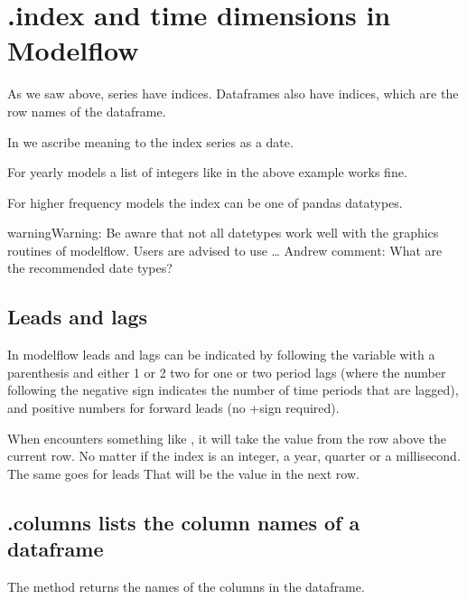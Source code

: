 \documentclass[letterpaper,10pt,english]{jupyterBook}
\begin{document}
\section{.index and time dimensions in Modelflow}
\label{\detokenize{content/04_PythonEssentials/PythonPackagesEtc:index-and-time-dimensions-in-modelflow}}
\sphinxAtStartPar
As we saw above, series have indices.  Dataframes also have indices, which are the row names of the dataframe.

\sphinxAtStartPar
In  we ascribe meaning to the index series as a date.

\sphinxAtStartPar
For yearly models a list of integers like in the above example works fine.

\sphinxAtStartPar
For higher frequency models the index can be one of pandas datatypes.

\begin{sphinxadmonition}{warning}{Warning:}
\sphinxAtStartPar
Be aware that not all datetypes work well with the graphics routines of modelflow.  Users are advised to use …
 Andrew comment: What are the recommended date types?
\end{sphinxadmonition}


\subsection{Leads and lags}
\label{\detokenize{content/04_PythonEssentials/PythonPackagesEtc:leads-and-lags}}
\sphinxAtStartPar
In modelflow leads and lags can be indicated by following the variable with a parenthesis and either \sphinxhyphen{}1 or \sphinxhyphen{}2 two for one or two period lags (where the number following the negative sign indicates the number of time periods that are lagged), and positive numbers for forward leads (no +sign required).

\sphinxAtStartPar
When  encounters something like , it will take the value from the row above the current row. No matter if the index is an integer, a year, quarter or a millisecond. The same goes for leads   That will be the value in the next row.


\subsection{.columns lists the column names of a dataframe}
\label{\detokenize{content/04_PythonEssentials/PythonPackagesEtc:columns-lists-the-column-names-of-a-dataframe}}
\sphinxAtStartPar
The method  returns the names of the columns in the dataframe.
\end{document}

